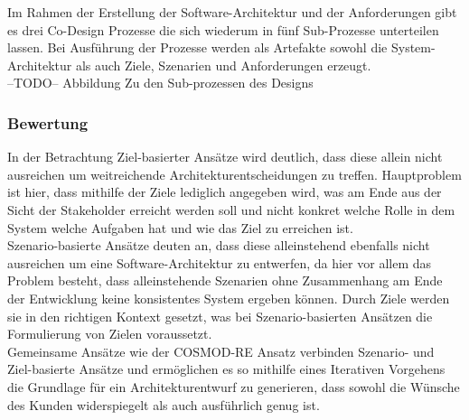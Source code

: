 Im Rahmen der Erstellung der Software-Architektur und der Anforderungen gibt es drei Co-Design Prozesse die sich wiederum in fünf Sub-Prozesse unterteilen lassen. Bei Ausführung der Prozesse werden als Artefakte sowohl die System-Architektur als auch Ziele, Szenarien und Anforderungen erzeugt. \\

--TODO-- Abbildung Zu den Sub-prozessen des Designs\\

\subsubsection{Bewertung}
In der Betrachtung Ziel-basierter Ansätze wird deutlich, dass diese allein nicht ausreichen um weitreichende Architekturentscheidungen zu treffen. Hauptproblem ist hier, dass mithilfe der Ziele lediglich angegeben wird, was am Ende aus der Sicht der Stakeholder erreicht werden soll und nicht konkret welche Rolle in dem System welche Aufgaben hat und wie das Ziel zu erreichen ist.\\

Szenario-basierte Ansätze deuten an, dass diese alleinstehend ebenfalls nicht ausreichen um eine Software-Architektur zu entwerfen, da hier vor allem das Problem besteht, dass alleinstehende Szenarien ohne Zusammenhang am Ende der Entwicklung keine konsistentes System ergeben können. Durch Ziele werden sie in den richtigen Kontext gesetzt, was bei Szenario-basierten Ansätzen die Formulierung von Zielen voraussetzt.\\

Gemeinsame Ansätze wie der COSMOD-RE Ansatz verbinden Szenario- und Ziel-basierte Ansätze und ermöglichen es so mithilfe eines Iterativen Vorgehens die Grundlage für ein Architekturentwurf zu generieren, dass sowohl die Wünsche des Kunden widerspiegelt als auch ausführlich genug ist.
